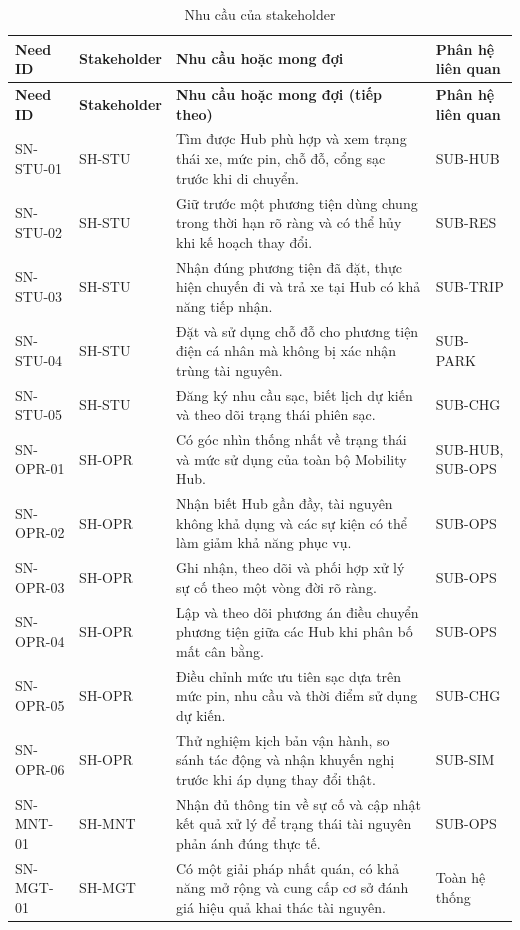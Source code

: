 \begingroup
\small
\begin{longtable}{|L{23mm}|L{27mm}|L{65mm}|L{24mm}|}
  \caption{Nhu cầu của stakeholder}\label{tab:stakeholder-needs}\\
  \hline
  \textbf{Need ID} & \textbf{Stakeholder} & \centering\arraybackslash\textbf{Nhu cầu hoặc mong đợi} & \textbf{Phân hệ liên quan}\\
  \hline
  \endfirsthead
  \hline
  \textbf{Need ID} & \textbf{Stakeholder} & \centering\arraybackslash\textbf{Nhu cầu hoặc mong đợi (tiếp theo)} & \textbf{Phân hệ liên quan}\\
  \hline
  \endhead
  SN-STU-01 & SH-STU & Tìm được Hub phù hợp và xem trạng thái xe, mức pin, chỗ đỗ, cổng sạc trước khi di chuyển. & SUB-HUB\\
  \hline
  SN-STU-02 & SH-STU & Giữ trước một phương tiện dùng chung trong thời hạn rõ ràng và có thể hủy khi kế hoạch thay đổi. & SUB-RES\\
  \hline
  SN-STU-03 & SH-STU & Nhận đúng phương tiện đã đặt, thực hiện chuyến đi và trả xe tại Hub có khả năng tiếp nhận. & SUB-TRIP\\
  \hline
  SN-STU-04 & SH-STU & Đặt và sử dụng chỗ đỗ cho phương tiện điện cá nhân mà không bị xác nhận trùng tài nguyên. & SUB-PARK\\
  \hline
  SN-STU-05 & SH-STU & Đăng ký nhu cầu sạc, biết lịch dự kiến và theo dõi trạng thái phiên sạc. & SUB-CHG\\
  \hline
  SN-OPR-01 & SH-OPR & Có góc nhìn thống nhất về trạng thái và mức sử dụng của toàn bộ Mobility Hub. & SUB-HUB, SUB-OPS\\
  \hline
  SN-OPR-02 & SH-OPR & Nhận biết Hub gần đầy, tài nguyên không khả dụng và các sự kiện có thể làm giảm khả năng phục vụ. & SUB-OPS\\
  \hline
  SN-OPR-03 & SH-OPR & Ghi nhận, theo dõi và phối hợp xử lý sự cố theo một vòng đời rõ ràng. & SUB-OPS\\
  \hline
  SN-OPR-04 & SH-OPR & Lập và theo dõi phương án điều chuyển phương tiện giữa các Hub khi phân bố mất cân bằng. & SUB-OPS\\
  \hline
  SN-OPR-05 & SH-OPR & Điều chỉnh mức ưu tiên sạc dựa trên mức pin, nhu cầu và thời điểm sử dụng dự kiến. & SUB-CHG\\
  \hline
  SN-OPR-06 & SH-OPR & Thử nghiệm kịch bản vận hành, so sánh tác động và nhận khuyến nghị trước khi áp dụng thay đổi thật. & SUB-SIM\\
  \hline
  SN-MNT-01 & SH-MNT & Nhận đủ thông tin về sự cố và cập nhật kết quả xử lý để trạng thái tài nguyên phản ánh đúng thực tế. & SUB-OPS\\
  \hline
  SN-MGT-01 & SH-MGT & Có một giải pháp nhất quán, có khả năng mở rộng và cung cấp cơ sở đánh giá hiệu quả khai thác tài nguyên. & Toàn hệ thống\\
  \hline
\end{longtable}
\endgroup

